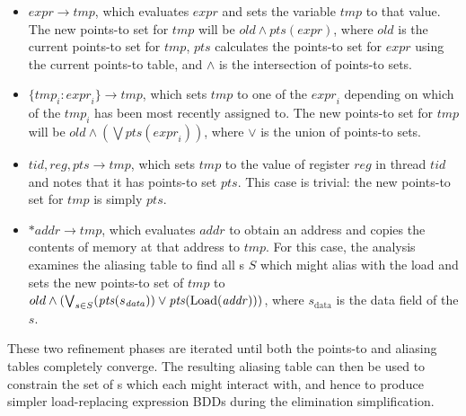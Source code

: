 \begin{itemize}
\item
   $\mathit{expr} {\rightarrow} \mathit{tmp}$, which
  evaluates $\mathit{expr}$ and sets the {\StateMachine} variable
  $\mathit{tmp}$ to that value.  The new points-to set for
  $\mathit{tmp}$ will be $\mathit{old} \wedge
  \mathit{pts}(\mathit{expr})$, where $\mathit{old}$ is the current
  points-to set for $\mathit{tmp}$, $\mathit{pts}$ calculates the
  points-to set for $\mathit{expr}$ using the current points-to table,
  and $\wedge$ is the intersection of points-to sets.
\item
  \state{$\Phi$} $\{\mathit{tmp}_i : \mathit{expr}_i\} {\rightarrow}
  \mathit{tmp}$, which sets $\mathit{tmp}$ to one of the
  $\mathit{expr}_i$ depending on which of the $tmp_i$ has been most
  recently assigned to.  The new points-to set for $\mathit{tmp}$ will
  be $\mathit{old} \wedge (\bigvee \mathit{pts}(\mathit{expr}_i))$, where
  $\vee$ is the union of points-to sets.
\item
   $\mathit{tid}, \mathit{reg}, \mathit{pts}
  \rightarrow \mathit{tmp}$, which sets $\mathit{tmp}$ to the value of
  register $\mathit{reg}$ in thread $\mathit{tid}$ and notes that it
  has points-to set $\mathit{pts}$.  This case is trivial: the new
  points-to set for $\mathit{tmp}$ is simply $\mathit{pts}$.
\item
   $\ast\mathit{addr} \rightarrow \mathit{tmp}$, which
  evaluates $\mathit{addr}$ to obtain an address and copies the
  contents of memory at that address to $\mathit{tmp}$.  For this
  case, the analysis examines the aliasing table to find all
  s $S$ which might alias with the load and sets the new
  points-to set of $\mathit{tmp}$ to $old \wedge (\bigvee_{s \in
    S}(\mathit{pts}(s_{\mathit{data}})) \vee \mathit{pts}(\mathrm{Load}(\mathit{addr})))$,
  where $s_{\mathrm{data}}$ is the data field of the 
  $s$.
\end{itemize}



These two refinement phases are iterated until both the points-to and
aliasing tables completely converge.  The resulting aliasing table can
then be used to constrain the set of s which each
 might interact with, and hence to produce simpler
load-replacing expression BDDs during the  elimination
simplification.


